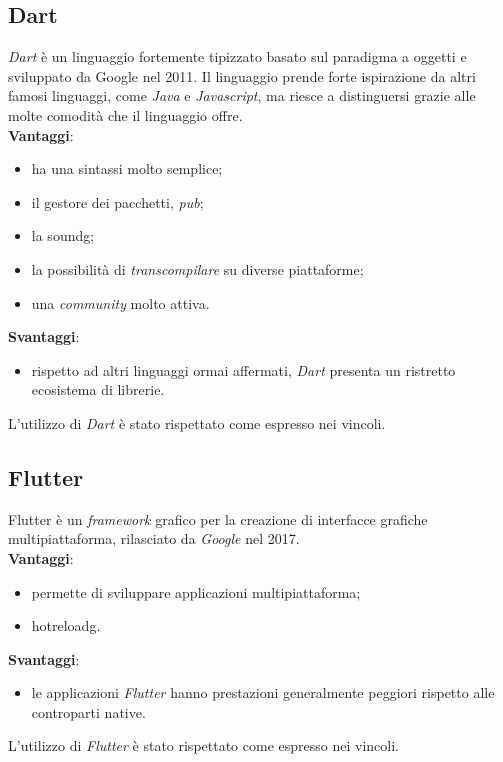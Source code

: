 \subsection{Dart} \textit{Dart} è un linguaggio fortemente tipizzato basato sul paradigma a oggetti e sviluppato da Google nel 2011. Il linguaggio prende forte ispirazione da altri famosi linguaggi, come \textit{Java} e \textit{Javascript}, ma riesce a distinguersi grazie alle molte comodità che il linguaggio offre. \\
\noindent \textbf{Vantaggi}:
\begin{itemize}
    \item ha una sintassi molto semplice;
    \item il gestore dei pacchetti, \textit{pub};
    \item la \gls{soundg};
    \item la possibilità di \textit{transcompilare} su diverse piattaforme;
    \item una \textit{community} molto attiva.
\end{itemize}
\noindent \textbf{Svantaggi}:
\begin{itemize}
    \item rispetto ad altri linguaggi ormai affermati, \textit{Dart} presenta un ristretto ecosistema di librerie.
\end{itemize}
\noindent L'utilizzo di \textit{Dart} è stato rispettato come espresso nei vincoli.

\subsection{Flutter} Flutter è un \textit{framework} grafico per la creazione di interfacce grafiche multipiattaforma, rilasciato da \textit{Google} nel 2017.\\
\noindent \textbf{Vantaggi}:
\begin{itemize}
    \item permette di sviluppare applicazioni multipiattaforma;
    \item \gls{hotreloadg}.
\end{itemize}
\noindent \textbf{Svantaggi}:
\begin{itemize}
    \item le applicazioni \textit{Flutter} hanno prestazioni generalmente peggiori rispetto alle controparti native.
\end{itemize}
\noindent L'utilizzo di \textit{Flutter} è stato rispettato come espresso nei vincoli.

